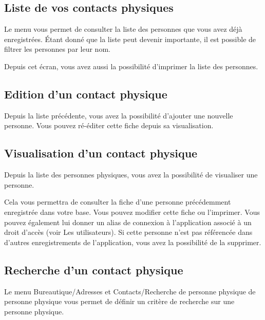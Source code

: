 \documentclass[a4paper,10pt,oneside,french]{sphinxmanual}
\begin{document}
\subsection{Liste de vos contacts physiques}
\label{\detokenize{contacts/individual:liste-de-vos-contacts-physiques}}
Le menu  vous permet de consulter la liste des personnes que vous avez déjà enregistrées. Étant donné que la liste peut devenir importante, il est possible de filtrer les personnes par leur nom.

Depuis cet écran, vous avez aussi la possibilité d’imprimer la liste des personnes.

\noindent{}


\subsection{Edition d’un contact physique}
\label{\detokenize{contacts/individual:edition-d-un-contact-physique}}
Depuis la liste précédente, vous avez la possibilité d’ajouter une nouvelle personne. Vous pouvez ré-éditer cette fiche depuis sa visualisation.

\noindent{}


\subsection{Visualisation d’un contact physique}
\label{\detokenize{contacts/individual:visualisation-d-un-contact-physique}}
Depuis la liste des personnes physiques, vous avez la possibilité de visualiser une personne.

Cela vous permettra de consulter la fiche d’une personne précédemment enregistrée dans votre base. Vous pouvez modifier cette fiche ou l’imprimer. Vous pouvez également lui donner un alias de connexion à l’application associé à un droit d’accès (voir Les utilisateurs). Si cette personne n’est pas référencée dans d’autres enregistrements de l’application, vous avez la possibilité de la supprimer.

\noindent{}


\subsection{Recherche d’un contact physique}
\label{\detokenize{contacts/individual:recherche-d-un-contact-physique}}
Le menu Bureautique/Adresses et Contacts/Recherche de personne physique de personne physique vous permet de définir un critère de recherche sur une personne physique.
\end{document}
